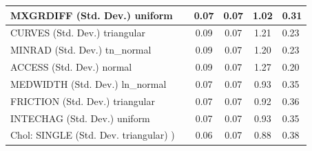 \begin{table}
\begin{center}
\begin{tabular}{|l|l|c|c|c|l|}
			\hline
			MXGRDIFF (Std. Dev.) uniform &  & 0.07 & 0.07 & 1.02 & 0.31 \\
			\hline
			CURVES (Std. Dev.) triangular &  & 0.09 & 0.07 & 1.21 & 0.23 \\
			\hline
			MINRAD (Std. Dev.) tn_normal &  & 0.09 & 0.07 & 1.20 & 0.23 \\
			\hline
			ACCESS (Std. Dev.) normal &  & 0.09 & 0.07 & 1.27 & 0.20 \\
			\hline
			MEDWIDTH (Std. Dev.) ln_normal &  & 0.07 & 0.07 & 0.93 & 0.35 \\
			\hline
			FRICTION (Std. Dev.) triangular &  & 0.07 & 0.07 & 0.92 & 0.36 \\
			\hline
			INTECHAG (Std. Dev.) uniform &  & 0.07 & 0.07 & 0.93 & 0.35 \\
			\hline
			 Chol: SINGLE (Std. Dev. triangular) ) &  & 0.06 & 0.07 & 0.88 & 0.38 \\
			\hline
		\end{tabular}
	\end{center}
\end{table}